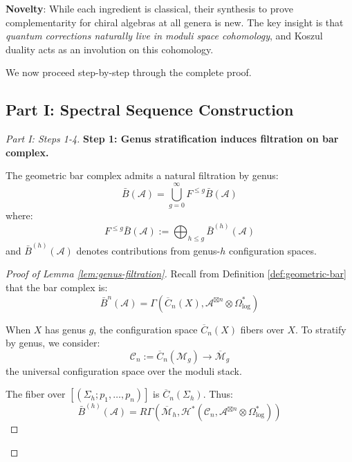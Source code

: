 \textbf{Novelty}: While each ingredient is classical, their synthesis to prove 
complementarity for chiral algebras at all genera is new. The key insight is that 
\emph{quantum corrections naturally live in moduli space cohomology}, and Koszul 
duality acts as an involution on this cohomology.

We now proceed step-by-step through the complete proof.

\subsection{Part I: Spectral Sequence Construction}

\begin{proof}[Part I: Steps 1-4]

\textbf{Step 1: Genus stratification induces filtration on bar complex.}

\begin{lemma}
\label{lem:genus-filtration}
The geometric bar complex admits a natural filtration by genus:
\begin{equation}
\bar{B}(\mathcal{A}) = \bigcup_{g=0}^\infty F^{\leq g} \bar{B}(\mathcal{A})
\end{equation}
where:
\begin{equation}
F^{\leq g} \bar{B}(\mathcal{A}) := \bigoplus_{h \leq g} \bar{B}^{(h)}(\mathcal{A})
\end{equation}
and $\bar{B}^{(h)}(\mathcal{A})$ denotes contributions from genus-$h$ configuration 
spaces.
\end{lemma}

\begin{proof}[Proof of Lemma \ref{lem:genus-filtration}]
Recall from Definition \ref{def:geometric-bar} that the bar complex is:
\begin{equation}
\bar{B}^n(\mathcal{A}) = \Gamma(\overline{C}_n(X), \mathcal{A}^{\boxtimes n} 
\otimes \Omega^*_{\log})
\end{equation}

When $X$ has genus $g$, the configuration space $\overline{C}_n(X)$ fibers over $X$. 
To stratify by genus, we consider:
\begin{equation}
\mathcal{C}_n := \overline{C}_n(\mathcal{M}_g) \to \overline{\mathcal{M}}_g
\end{equation}
the universal configuration space over the moduli stack.

The fiber over $[(\Sigma_h; p_1, \ldots, p_n)]$ is $\overline{C}_n(\Sigma_h)$. Thus:
\begin{equation}
\bar{B}^{(h)}(\mathcal{A}) = R\Gamma(\overline{\mathcal{M}}_h, \mathcal{H}^*(\mathcal{
C}_n, \mathcal{A}^{\boxtimes n} \otimes \Omega^*_{\log}))
\end{equation}


\end{proof}
\end{proof}
